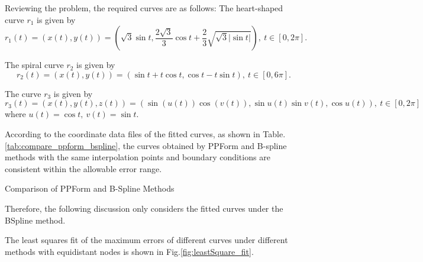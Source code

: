\documentclass[a4paper]{article}
\begin{document}
\begin{sloppypar}
Reviewing the problem, the required curves are as follows: The heart-shaped
curve \(r_1\) is given by $$ r_1(t)=(x(t),y(t))=\left(\sqrt{3} \sin t, \frac{2
    \sqrt{3}}{3} \cos t + \frac{2}{3} \sqrt{\sqrt{3} |\sin t|}\right),\ t\in
  [0,2\pi]. $$

The spiral curve \(r_2\) is given by $$ r_2(t)=(x(t),y(t))=(\sin t+t\cos t,\cos
  t-t\sin t),\ t\in[0,6\pi]. $$

The curve \(r_3\) is given by $$
  r_3(t)=(x(t),y(t),z(t))=(\sin(u(t))\cos(v(t)),\sin u(t)\sin v(t),\cos u(t)),\
  t\in[0,2\pi] $$ where \(u(t)=\cos t,\:v(t)=\sin t\).

According to the coordinate data files of the fitted curves, as shown in
Table.\ref{tab:compare_ppform_bspline}, the curves obtained by PPForm and
B-spline methods with the same interpolation points and boundary conditions are
consistent within the allowable error range.

\begin{table}[H]
  \centering
  \renewcommand{\tablename}{Table.}
  \caption{Comparison of PPForm and B-Spline Methods}
  \label{tab:compare_ppform_bspline}
\end{table}

Therefore, the following discussion only considers the fitted curves under the
BSpline method.

The least squares fit of the maximum errors of different curves under different
methods with equidistant nodes is shown in Fig.\ref{fig:leastSquare_fit}.


\end{sloppypar}
\end{document}
